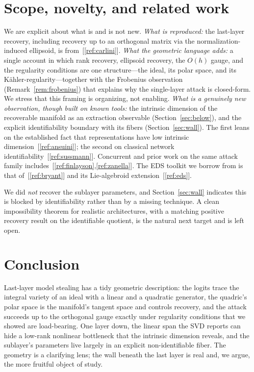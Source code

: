 \documentclass[11pt]{article}
\begin{document}
\section{Scope, novelty, and related work}\label{sec:scope}

We are explicit about what is and is not new.
\emph{What is reproduced:} the last-layer recovery, including recovery up to an
orthogonal matrix via the normalization-induced ellipsoid, is
from~[\ref{ref:carlini}]. \emph{What the geometric language adds:} a single
account in which rank recovery, ellipsoid recovery, the $O(h)$ gauge, and the
regularity conditions are one structure---the ideal, its polar space, and its
K\"ahler-regularity---together with the Frobenius observation
(Remark~\ref{rem:frobenius}) that explains why the single-layer attack is
closed-form. We stress that this framing is organizing, not enabling. \emph{What
is a genuinely new observation, though built on known tools:} the intrinsic
dimension of the recoverable manifold as an extraction observable
(Section~\ref{sec:below}), and the explicit identifiability boundary with its
fibers (Section~\ref{sec:wall}). The first leans on the established fact that
representations have low intrinsic dimension~[\ref{ref:ansuini}]; the second on
classical network identifiability~[\ref{ref:sussmann}]. Concurrent and prior work
on the same attack family includes~[\ref{ref:finlayson},\ref{ref:zanella}]. The
EDS toolkit we borrow from is that of~[\ref{ref:bryant}] and its Lie-algebroid
extension~[\ref{ref:eds}].

We did \emph{not} recover the sublayer parameters, and
Section~\ref{sec:wall} indicates this is blocked by identifiability rather than
by a missing technique. A clean impossibility theorem for realistic
architectures, with a matching positive recovery result on the identifiable
quotient, is the natural next target and is left open.

\section{Conclusion}

Last-layer model stealing has a tidy geometric description: the logits trace the
integral variety of an ideal with a linear and a quadratic generator, the
quadric's polar space is the manifold's tangent space and controls recovery, and
the attack succeeds up to the orthogonal gauge exactly under regularity
conditions that we showed are load-bearing. One layer down, the linear span the
SVD reports can hide a low-rank nonlinear bottleneck that the intrinsic
dimension reveals, and the sublayer's parameters live largely in an explicit
non-identifiable fiber. The geometry is a clarifying lens; the wall beneath the
last layer is real and, we argue, the more fruitful object of study.
\end{document}
